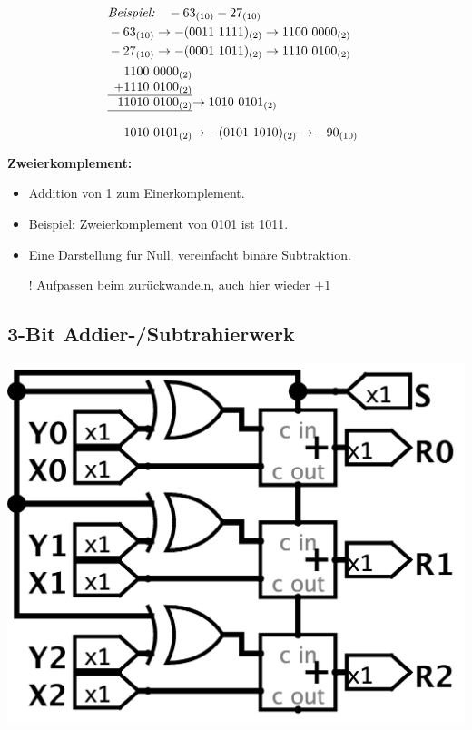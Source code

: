 \documentclass[a4paper,6pt]{article}
\begin{document}
\begin{multicols*}{3}
\begin{align*}
    & \textit{Beispiel:} \quad -63_{(10)} - 27_{(10)} \\
    & -63_{(10)} \rightarrow  -(0011\ 1111)_{(2)} \rightarrow 1100\ 0000_{(2)} \\
    & -27_{(10)} \rightarrow  -(0001\ 1011)_{(2)} \rightarrow 1110\ 0100_{(2)} \\
    & \begin{array}{r@{}c@{}l}
        &1100\ 0000_{(2)} & \\
        +&1110\ 0100_{(2)} & \\
        \cline{1-2}
        1&1010\ 0100_{(2)} & \rightarrow 1010\ 0101_{(2)} \\
        \cline{1-2}
        \\
        &1010\ 0101_{(2)} & \rightarrow -(0101\ 1010)_{(2)} \rightarrow -90_{(10)}
    \end{array}
\end{align*}

\textbf{Zweierkomplement:}
\begin{itemize}
    \item Addition von 1 zum Einerkomplement.
    \item Beispiel: Zweierkomplement von 0101 ist 1011.
    \item Eine Darstellung für Null, vereinfacht binäre Subtraktion.
    \item[!] Aufpassen beim zurückwandeln, auch hier wieder $+1$ 
\end{itemize}


\subsection*{3-Bit Addier-/Subtrahierwerk}

\begin{center}
    \includegraphics[width=0.75\linewidth]{resources/3Bit-Addierwerk.png}
\end{center}


\end{multicols*}
\end{document}
